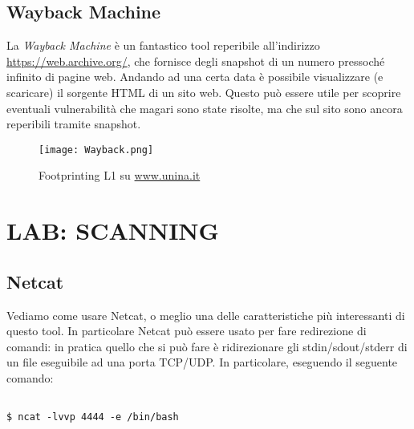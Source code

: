 \documentclass[14pt]{extreport}
\begin{document}
\section{Wayback Machine}

La \textit{Wayback Machine} è un fantastico tool reperibile all'indirizzo \url{https://web.archive.org/}, che fornisce degli snapshot di un numero pressoché infinito di pagine web. Andando ad una certa data è possibile visualizzare (e scaricare) il sorgente HTML di un sito web. Questo può essere utile per scoprire eventuali vulnerabilità che magari sono state risolte, ma che sul sito sono ancora reperibili tramite snapshot.


\begin{figure}[H]
    \centering
    \texttt{[image: Wayback.png]}
    \caption{Footprinting L1 su \url{www.unina.it}}
\end{figure}




















\chapter{LAB: SCANNING}

\section{Netcat}

Vediamo come usare Netcat, o meglio una delle caratteristiche più interessanti di questo tool. In particolare Netcat può essere usato per fare redirezione di comandi: in pratica quello che si può fare è ridirezionare gli stdin/sdout/stderr di un file eseguibile ad una porta TCP/UDP. In particolare, eseguendo il seguente comando:



\vspace{5pt}

{
\small
\begin{tcolorbox}

\begin{verbatim}

$ ncat -lvvp 4444 -e /bin/bash
  
\end{verbatim}

\end{tcolorbox}
}
\end{document}

